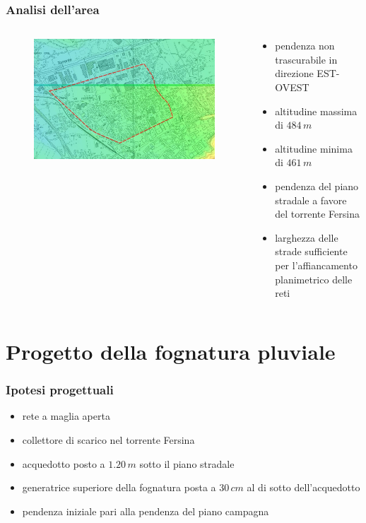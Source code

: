 \documentclass{beamer}
\begin{document}
\begin{frame}
 \frametitle{Analisi dell'area}
 
 \begin{columns}
  \begin{column}{.5\textwidth}
   \begin{figure}
    \centering
    \includegraphics[width=\linewidth]{images/analisi_area}
   \end{figure}
  \end{column}
  
  \begin{column}{.5\textwidth}
   \begin{itemize}[<+->]
    \item pendenza non trascurabile in direzione EST-OVEST
    \item altitudine massima di $484\,m$
    \item altitudine minima di $461\,m$
    \item pendenza del piano stradale a favore del torrente Fersina
    \item larghezza delle strade sufficiente per l'affiancamento planimetrico delle reti
   \end{itemize}
  \end{column}
 \end{columns} 
\end{frame}

\section{Progetto della fognatura pluviale}
\begin{frame}
 \frametitle{Ipotesi progettuali}
 \begin{itemize}[<+->]
  \item rete a maglia aperta
  \item collettore di scarico nel torrente Fersina
  \item acquedotto posto a $1.20\,m$ sotto il piano stradale
  \item generatrice superiore della fognatura posta a $30\,cm$ al di sotto dell'acquedotto
  \item pendenza iniziale pari alla pendenza del piano campagna
 \end{itemize}
\end{frame}
\end{document}
